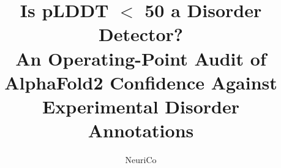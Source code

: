 \documentclass{article}
\title{Is \texorpdfstring{pLDDT $<$ 50}{pLDDT < 50} a Disorder Detector?\\
An Operating-Point Audit of AlphaFold2 Confidence Against Experimental Disorder Annotations}
\author{NeuriCo}
\begin{document}
\maketitle

\begin{abstract}

\end{abstract}










\appendix

\end{document}
